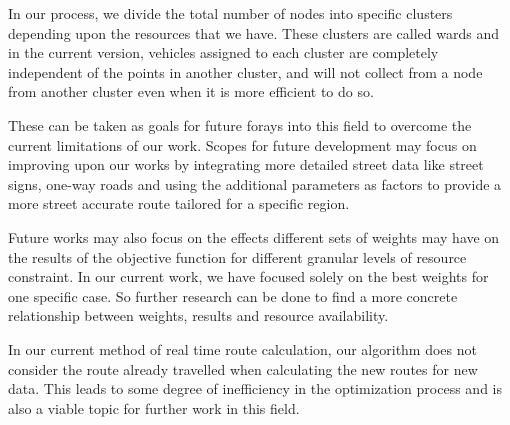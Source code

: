 \documentclass[12pt]{article}
\begin{document}
In our process, we divide the total number of nodes into specific clusters depending upon the resources that we have. These clusters are called wards and in the current version, vehicles assigned to each cluster are completely independent of the points in another cluster, and will not collect from a node from another cluster even when it is more efficient to do so. 

These can be taken as goals for future forays into this field to overcome the current limitations of our work. Scopes for future development may focus on improving upon our works by integrating more detailed street data like street signs, one-way roads and using the additional parameters as factors to provide a more street accurate route tailored for a specific region.

Future works may also focus on the effects different sets of weights may have on the results of the objective function for different granular levels of resource constraint. In our current work, we have focused solely on the best weights for one specific case. So further research can be done to find a more concrete relationship between weights, results and resource availability. 

In our current method of real time route calculation, our algorithm does not consider the route already travelled when calculating the new routes for new data. This leads to some degree of inefficiency in the optimization process and is also a viable topic for further work in this field.



\end{document}
